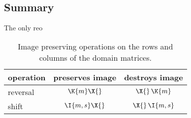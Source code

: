 \clearpage
\subsection{Summary}
The only reo

\begin{table}[htdp]
\begin{center}
\begin{tabular}{l|cc}
 operation & preserves image & destroys image \\\hline
 reversal  & $\K{m}\X{}$    & $\X{} \, \K{m}$ \\
 shift     & $\I{m,s}\X{}$  & $\X{} \, \I{m,s}$
\end{tabular}
\end{center}
\label{tab:Jordan:shift:summary}
\caption[Image preserving operations on the domain matrices]{Image preserving operations on the rows and columns of the domain matrices.}
\end{table}%


\endinput